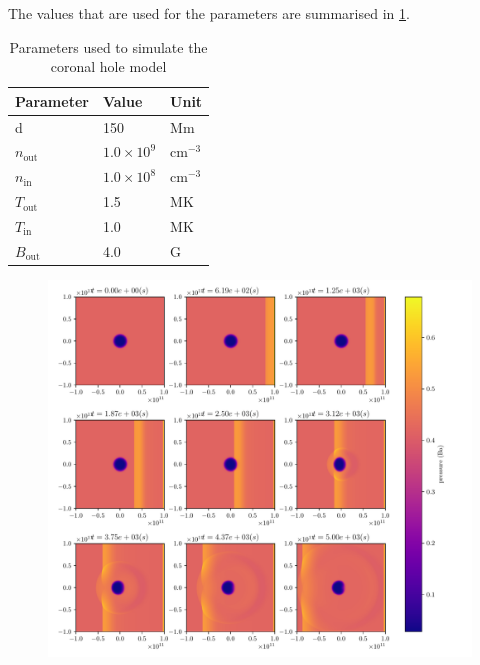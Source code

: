 \documentclass[a4paper]{article}
\let\oldcap\caption
\renewcommand{\caption}[1]{\parbox{.9\linewidth}{\oldcap{#1}}}
\begin{document}
The values that are used for the parameters are summarised in \cref{tab:coronal_hole}.
\begin{table}[H]
    \centering
    \caption{Parameters used to simulate the coronal hole model}
    \label{tab:coronal_hole}
    \begin{tabular}{|l|l|l|}
    \hline
    \textbf{Parameter}             & \textbf{Value}                                  & \textbf{Unit}              \\ \hline
    d                              & 150                                             & Mm                         \\ \hline
    $n_\text{out}$ & $1.0 \times 10^9$ & $\text{cm}^{-3}$ \\ \hline
    $n_\text{in}$                              & $1.0 \times 10^8$                                               & $\text{cm}^{-3}$                          \\ \hline
    $T_\text{out}$                              & 1.5                                               & MK                          \\ \hline
    $T_\text{in}$                              & 1.0                                               & MK                          \\ \hline
    $B_\text{out}$                              & 4.0                                               & G                          \\ \hline
\end{tabular}
\end{table}
\begin{figure}[h]
	\centering
	\includegraphics[width=1\textwidth]{figures/hole_time.pdf}
	\caption{}
	\label{fig:figures-hole}
\end{figure}
\end{document}
